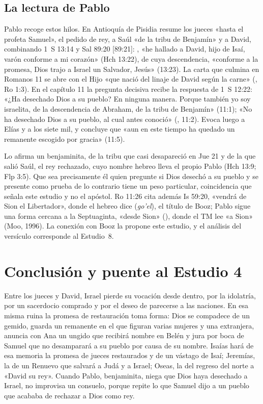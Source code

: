 \subsection{La lectura de Pablo}
Pablo recoge estos hilos. En Antioquía de Pisidia resume los jueces «hasta el profeta Samuel», el pedido de rey, a Saúl «de la tribu de Benjamín» y a David, combinando 1~S 13:14 y Sal 89:20 [89:21]: , «he hallado a David, hijo de Isaí, varón conforme a mi corazón» (Hch 13:22), de cuya descendencia, «conforme a la promesa, Dios trajo a Israel un Salvador, Jesús» (13:23). La carta que culmina en Romanos 11 se abre con el Hijo «que nació del linaje de David según la carne» (, Ro 1:3). En el capítulo 11 la pregunta decisiva recibe la respuesta de 1~S 12:22: «¿Ha desechado Dios a su pueblo? En ninguna manera. Porque también yo soy israelita, de la descendencia de Abraham, de la tribu de Benjamín» (11:1); «No ha desechado Dios a su pueblo, al cual antes conoció» (, 11:2). Evoca luego a Elías y a los siete mil, y concluye que «aun en este tiempo ha quedado un remanente escogido por gracia» (11:5).

Lo afirma un benjaminita, de la tribu que casi desapareció en Jue 21 y de la que salió Saúl, el rey rechazado, cuyo nombre hebreo lleva el propio Pablo (Hch 13:9; Flp 3:5). Que sea precisamente él quien pregunte si Dios desechó a su pueblo y se presente como prueba de lo contrario tiene un peso particular, coincidencia que señala este estudio y no el apóstol. Ro 11:26 cita además Is 59:20, «vendrá de Sion el Libertador», donde el hebreo dice  (\emph{go'el}), el título de Booz; Pablo sigue una forma cercana a la Septuaginta, «desde Sion» (), donde el TM lee «a Sion» (Moo, 1996). La conexión con Booz la propone este estudio, y el análisis del versículo corresponde al Estudio~8.

\section{Conclusión y puente al Estudio 4}

Entre los jueces y David, Israel pierde su vocación desde dentro, por la idolatría, por un sacerdocio comprado y por el deseo de parecerse a las naciones. En esa misma ruina la promesa de restauración toma forma: Dios se compadece de un gemido, guarda un remanente en el que figuran varias mujeres y una extranjera, anuncia con Ana un ungido que recibirá nombre en Belén y jura por boca de Samuel que no desamparará a su pueblo por causa de su nombre. Isaías hará de esa memoria la promesa de jueces restaurados y de un vástago de Isaí; Jeremías, la de un Renuevo que salvará a Judá y a Israel; Oseas, la del regreso del norte a «David su rey». Cuando Pablo, benjaminita, niega que Dios haya desechado a Israel, no improvisa un consuelo, porque repite lo que Samuel dijo a un pueblo que acababa de rechazar a Dios como rey.

